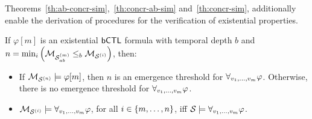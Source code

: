 
Theorems~\ref{th:ab-concr-sim},~\ref{th:concr-ab-sim} and~\ref{th:concr-sim},
additionally enable the derivation of  procedures for the verification of
existential properties.

\begin{corollary}
\label{cor:existential}
If $\varphi[m]$ is an existential $\sf{bCTL}$ formula with temporal depth $b$ and  $n
= \min_i \left( \mathcal{M}_{\mathcal{S}_{ab}^{(m)}} \leq_b \mathcal{M}_{\mathcal{S}^{(i)}} \right)$, then:
\begin{itemize}[$\bullet$]
\item If $\mathcal{M}_{\mathcal{S}^{(n)}} \models \varphi[m]$, then $n$ is an emergence threshold for
$\forall_{v_1,\ldots,v_m} \varphi$. Otherwise, there is no emergence threshold for $\forall_{v_1,\ldots,v_m} \varphi$.

\item $\mathcal{M}_{\mathcal{S}^{(i)}} \models \forall_{v_1,\ldots,v_m} \varphi$, for all $i \in \left \{ m, \ldots, n \right \}$, iff
$\mathcal S \models \forall_{v_1,\ldots,v_m} \varphi$.
\end{itemize}
\end{corollary}


